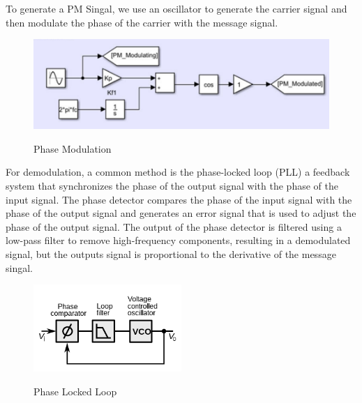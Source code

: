 \documentclass[12pt]{article}
\begin{document}
To generate a PM Singal, we use an oscillator to generate the carrier signal and then modulate the phase of the carrier with the message signal. 
\begin{figure}[H]
    \centering
    \includegraphics[width=1\textwidth]{assets/mod.png}
    \caption{Phase Modulation}
    \cite{Prelab}
\end{figure}

For demodulation, a common method is the phase-locked loop (PLL) a feedback system that synchronizes the phase of the output signal with the phase of the input signal. The phase detector compares the phase of the input signal with the phase of the output signal and generates an error signal that is used to adjust the phase of the output signal. The output of the phase detector is filtered using a low-pass filter to remove high-frequency components, resulting in a demodulated signal, but the outputs signal is proportional to the derivative of the message singal.
\begin{figure}[H]
    \centering
    \includegraphics[width=0.5\textwidth]{assets/img/PLL.png}
    \caption{Phase Locked Loop}
    \cite{wikipedia_pll}
\end{figure}
\end{document}
